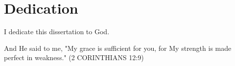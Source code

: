 \chapter*{Dedication}
\thispagestyle{empty}
\doublespacing
\begin{center}
I dedicate this dissertation to God.

And He said to me, "My grace is sufficient for you, for My strength is made perfect in weakness." (2 CORINTHIANS 12:9)
\end{center}